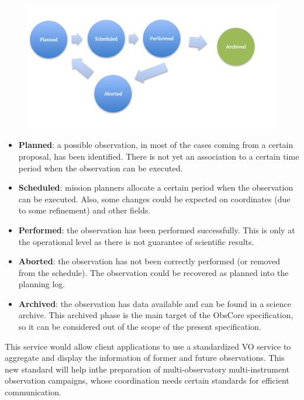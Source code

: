 \documentclass[11pt,a4paper]{ivoa}
\begin{document}
\begin{figure}[H]
\advance\leftskip 0.0in		\hfill\includegraphics{./media/observations_workflow.png}\hfill\strut%
\end{figure}

\begin{itemize}
	\item \textbf{Planned}: a possible observation, in most of the cases coming from a certain proposal, has been identified. There is not yet an association to a certain time period when the observation can be executed.

	\item \textbf{Scheduled}: mission planners allocate a certain period when the 
	observation can be executed. Also, some changes could be expected on coordinates 
	(due to some refinement) and other fields.

	\item \textbf{Performed}: the observation has been performed successfully. This is only at the operational level as there is not guarantee of scientific results.

	\item \textbf{Aborted}: the observation has not been correctly performed (or removed from the schedule). The observation could be recovered as planned into the planning log.

	\item \textbf{Archived}: the observation has data available and can be found in a science archive. This archived phase is the main target of the ObsCore specification, so it can be considered out of the scope of the present specification.
\end{itemize}

This service would allow client applications to use a standardized VO service to aggregate 
and display the information of former and future observations. This new standard will help 
inthe preparation of multi-observatory multi-instrument observation campaigns, whose 
coordination needs certain standards for efficient communication.
\end{document}

